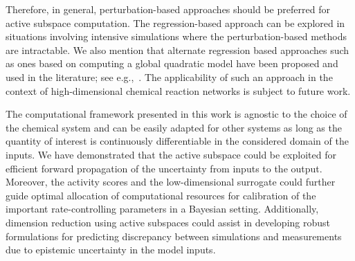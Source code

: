 %
Therefore, in general, perturbation-based approaches should be preferred for 
active subspace computation.
The regression-based approach can be explored in situations involving intensive
simulations where the perturbation-based methods are intractable.
%
%
We also mention that alternate regression based approaches such as ones based
on computing a global quadratic model have been proposed and used in the
literature; see e.g.,~\cite{Constantine:2017a}.  The applicability of such an
approach in the context of high-dimensional chemical reaction networks is
subject to future work. 

The computational framework presented in this work is agnostic to the choice of
the chemical system and can be easily adapted for other systems as long
as the quantity of interest is continuously differentiable in the considered
domain of the inputs.  We have demonstrated that the active subspace could be
exploited for efficient forward propagation of the uncertainty from inputs to
the output. Moreover, the activity scores and the low-dimensional surrogate
could further guide optimal allocation of computational resources for
calibration of the important rate-controlling parameters in a Bayesian setting.
Additionally, dimension reduction using active subspaces could assist in
developing robust formulations for predicting discrepancy between simulations
and measurements due to epistemic uncertainty in the model inputs.
